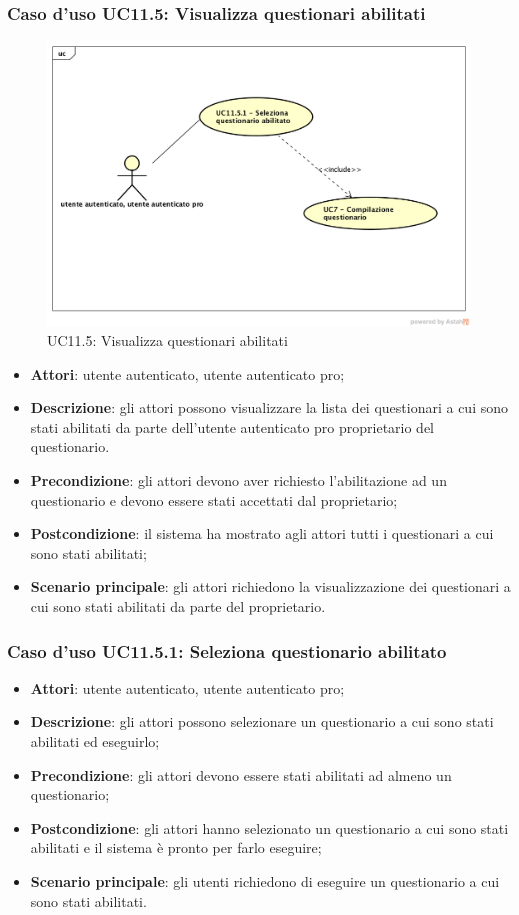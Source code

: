 \subsubsection{Caso d'uso UC11.5: Visualizza questionari abilitati}
\label{UC11.5}
\begin{figure}[h]
	\centering
	\includegraphics[scale=0.5]{UML/UC11_5.png}
	\caption{UC11.5: Visualizza questionari abilitati}
\end{figure}
\begin{itemize}
\item\textbf{Attori}: utente autenticato, utente autenticato pro;
\item\textbf{Descrizione}: gli attori possono visualizzare la lista dei questionari a cui sono stati abilitati da parte dell'utente autenticato pro proprietario del questionario.
\item\textbf{Precondizione}: gli attori devono aver richiesto l'abilitazione ad un questionario e devono essere stati accettati dal proprietario;
\item\textbf{Postcondizione}: il sistema ha mostrato agli attori tutti i questionari a cui sono stati abilitati;
\item\textbf{Scenario principale}: gli attori richiedono la visualizzazione dei questionari a cui sono stati abilitati da parte del proprietario. 
\end{itemize}

\subsubsection{Caso d'uso UC11.5.1: Seleziona questionario abilitato}
\begin{itemize}
\item\textbf{Attori}: utente autenticato, utente autenticato pro;
\item\textbf{Descrizione}: gli attori possono selezionare un questionario a cui sono stati abilitati ed eseguirlo;
\item\textbf{Precondizione}: gli attori devono essere stati abilitati ad almeno un questionario;
\item\textbf{Postcondizione}: gli attori hanno selezionato un questionario a cui sono stati abilitati e il sistema è pronto per farlo eseguire;
\item\textbf{Scenario principale}: gli utenti richiedono di eseguire un questionario a cui sono stati abilitati.
\end{itemize}